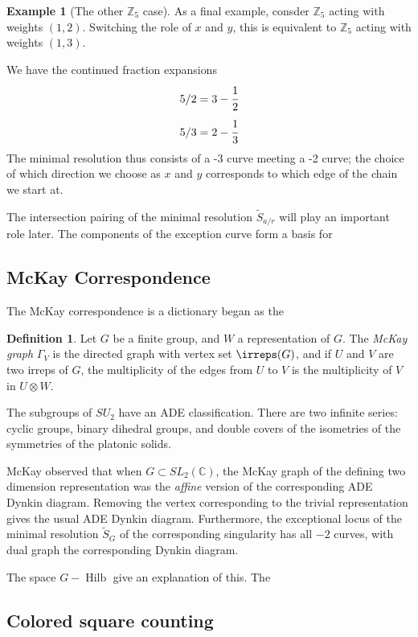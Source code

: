 \documentclass{amsart}[12pt]
\theoremstyle{definition}
\newtheorem{example}[dummy]{Example}
\newtheorem{definition}[dummy]{Definition}
\newcommand{\Z}{\mathbb{Z}}
\newcommand{\C}{\mathbb{C}}
\DeclareMathOperator{\Hilb}{Hilb}
\begin{document}
\begin{example}[The other $\Z_5$ case]
As a final example, consder $\Z_5$ acting with weights $(1,2)$.  Switching the role of $x$ and $y$, this is equivalent to $\Z_5$ acting with weights $(1,3)$.

We have the continued fraction expansions
$$5/2=3-\cfrac{1}{2}$$
$$5/3=2-\cfrac{1}{3}$$
The minimal resolution thus consists of a -3 curve meeting a -2 curve; the choice of which direction we choose as $x$ and $y$ corresponds to which edge of the chain we start at.
\end{example}

The intersection pairing of the minimal resolution $\widetilde{S}_{a/r}$ will play an important role later.  The components of the exception curve form a basis for 


\subsection{McKay Correspondence}
The McKay correspondence is a dictionary began as the

\begin{definition}
Let $G$ be a finite group, and $W$ a representation of $G$.  The \emph{McKay graph} $\Gamma_V$ is the directed graph with vertex set $\irreps(G)$, and if $U$ and $V$ are two irreps of $G$, the multiplicity of the edges from $U$ to $V$ is the multiplicity of $V$ in $U\otimes W$.
\end{definition}

The subgroups of $SU_2$ have an ADE classification.  There are two infinite series: cyclic groups, binary dihedral groups, and double covers of the isometries of the symmetries of the platonic solids.

McKay observed that when $G\subset SL_2(\C)$, the McKay graph of the defining two dimension representation was the \emph{affine} version of the corresponding ADE Dynkin diagram.  Removing the vertex corresponding to the trivial representation gives the usual ADE Dynkin diagram.  Furthermore, the exceptional locus of the minimal resolution $\widetilde{S}_G$ of the corresponding singularity has all $-2$ curves, with dual graph the corresponding Dynkin diagram. 

The space $G-\Hilb$ give an explanation of this.  The 



\subsection{Colored square counting}
\end{document}
